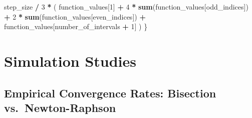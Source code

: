 \documentclass[
]{article}
\newenvironment{Shaded}{\begin{snugshade}}{\end{snugshade}}
\newcommand{\DecValTok}[1]{\textcolor[rgb]{0.00,0.00,0.81}{#1}}
\newcommand{\FunctionTok}[1]{\textcolor[rgb]{0.13,0.29,0.53}{\textbf{#1}}}
\newcommand{\NormalTok}[1]{#1}
\newcommand{\SpecialCharTok}[1]{\textcolor[rgb]{0.81,0.36,0.00}{\textbf{#1}}}
\begin{document}
\begin{Shaded}
\begin{Highlighting}[]
\NormalTok{  step\_size }\SpecialCharTok{/} \DecValTok{3} \SpecialCharTok{*}\NormalTok{ (}
\NormalTok{    function\_values[}\DecValTok{1}\NormalTok{] }\SpecialCharTok{+}
      \DecValTok{4} \SpecialCharTok{*} \FunctionTok{sum}\NormalTok{(function\_values[odd\_indices]) }\SpecialCharTok{+}
      \DecValTok{2} \SpecialCharTok{*} \FunctionTok{sum}\NormalTok{(function\_values[even\_indices]) }\SpecialCharTok{+}
\NormalTok{      function\_values[number\_of\_intervals }\SpecialCharTok{+} \DecValTok{1}\NormalTok{]}
\NormalTok{  )}
\NormalTok{\}}
\end{Highlighting}
\end{Shaded}

\section{Simulation Studies}\label{simulation-studies}

\subsection{Empirical Convergence Rates: Bisection
vs.~Newton-Raphson}\label{empirical-convergence-rates-bisection-vs.-newton-raphson}
\end{document}
